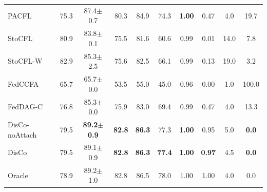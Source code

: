 \begin{tabular}{lccccccccc}
PACFL & 75.3 & 87.4$\pm$0.7 & 80.3 & 84.9 & 74.3 & \textbf{1.00} & 0.47 & 4.0 & 19.7 \\
StoCFL & 80.9 & 83.8$\pm$0.1 & 75.5 & 81.6 & 60.6 & 0.99 & 0.01 & 14.0 & 7.8 \\
StoCFL-W & 82.9 & 85.3$\pm$2.5 & 75.6 & 82.5 & 66.1 & 0.99 & 0.13 & 19.0 & 3.2 \\
FedCCFA & 65.7 & 65.7$\pm$0.0 & 53.5 & 55.0 & 45.0 & 0.96 & 0.00 & 1.0 & 100.0 \\
FedDAG-C & 76.8 & 85.3$\pm$0.0 & 75.9 & 83.0 & 69.4 & 0.99 & 0.47 & 4.0 & 13.3 \\
DisCo-noAttach & 79.5 & \textbf{89.2$\pm$0.9} & \textbf{82.8} & \textbf{86.3} & 77.3 & \textbf{1.00} & 0.95 & 5.0 & \textbf{0.0} \\
DisCo & 79.5 & 89.1$\pm$0.9 & \textbf{82.8} & \textbf{86.3} & \textbf{77.4} & \textbf{1.00} & \textbf{0.97} & 4.5 & \textbf{0.0} \\
Oracle & 78.9 & 89.2$\pm$1.0 & 82.8 & 86.5 & 78.0 & 1.00 & 1.00 & 4.0 & 0.0 \\
\bottomrule
\end{tabular}
